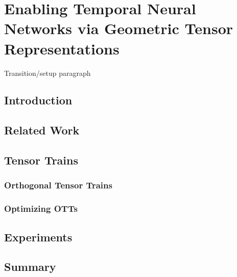 \chapter{Enabling Temporal Neural Networks via Geometric Tensor Representations} \label{chap:ott} 

Transition/setup paragraph

\section{Introduction}

\section{Related Work}

\section{Tensor Trains}

\subsection{Orthogonal Tensor Trains}

\subsection{Optimizing OTTs}

\section{Experiments}

\section{Summary}
